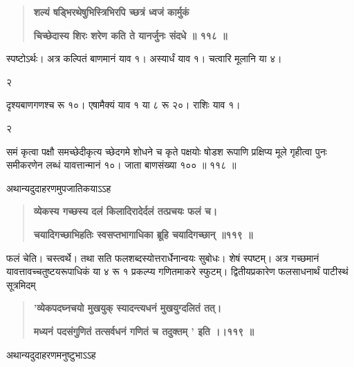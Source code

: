 \documentclass[11pt, openany]{book}
\begin{document}
\begin{sloppypar}
\begin{quote}
\hspace{1in}\textbf{शल्यं षड्भिरथेषुभिस्त्रिभिरपि च्छत्रं ध्वजं कार्मुकं}

\hspace{1in}\textbf{चिच्छेदास्य शिरः शरेण कति ते यानर्जुनः संदधे ॥ ११८ ॥}
\end{quote}

\hangindent=0.2in \hspace{0.2in}स्पष्टोऽर्थः। अत्र कल्पितं बाणमानं याव १। अस्यार्धं याव १। चत्वारि मूलानि या ४।

\hspace{3.75in}२

\hangindent=0.2in दृश्यबाणगणश्च रू १०। एषामैक्यं याव १ या ८ रू २०। राशिः याव १।

\hspace{2.45in}२

\hangindent=0.2in समं कृत्वा पक्षौ समच्छेदीकृत्य च्छेदगमे शोधने च कृते पक्षयोः षोडश रूपाणि प्रक्षिप्य मूले गृहीत्वा पुनः समीकरणेन लब्धं यावत्तान्मानं १०। जाता बाणसंख्या १०० ॥ ११८ ॥

\hangindent=0.2in \hspace{0.2in}अथान्यदुदाहरणमुपजातिकयाऽऽह\textendash

\begin{quote}
\hspace{0.5in}\textbf{व्येकस्य गच्छस्य दलं किलादिरादेर्दलं तत्प्रचयः फलं च।}

\hspace{0.5in}\textbf{चयादिगच्छाभिहतिः स्वसप्तभागाधिका ब्रूहि चयादिगच्छान् ॥११९ ॥}
\end{quote}

\hangindent=0.2in \hspace{0.2in}फलं चेति। चस्त्वर्थे। तथा सति फलशब्दस्योत्तरार्धेनान्वयः सुबोधः। शेषं स्पष्टम्। अत्र गच्छमानं यावत्तावच्चतुष्टयरूपाधिकं या ४ रू १ प्रकल्प्य गणितमाकरे स्फुटम्। द्वितीयप्रकारेण फलसाधनार्थं पाटीस्थं सूत्रमिदम्\textendash

\begin{quote}
\hspace{1in}\textbf{'व्येकपदघ्नचयो मुखयुक् स्यादन्त्यधनं मुखयुग्दलितं तत्।}

\hspace{1in}\textbf{मध्यनं पदसंगुणितं तत्सर्वधनं गणितं च तदुक्तम् ' इति ।।११९ ॥}
\end{quote}

\hangindent=0.2in \hspace{0.2in}अथान्यदुदाहरणमनुष्टुभाऽऽह\textendash


\end{sloppypar}
\end{document}
